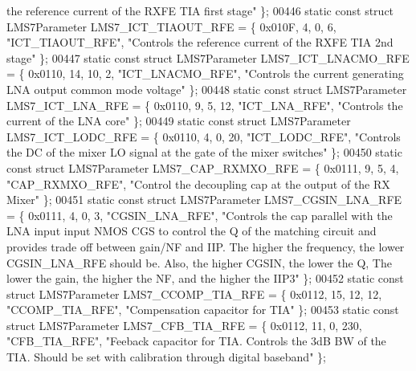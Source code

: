 \begin{DoxyCode}
{       the reference current of the RXFE TIA first stage"} \};
00446 \textcolor{keyword}{static} \textcolor{keyword}{const} \textcolor{keyword}{struct }LMS7Parameter LMS7_ICT_TIAOUT_RFE = \{ 0x010F, 4, 0, 6, \textcolor{stringliteral}{"ICT\_TIAOUT\_RFE"}, \textcolor{stringliteral}{"Controls the
       reference current of the RXFE TIA 2nd stage"} \};
00447 \textcolor{keyword}{static} \textcolor{keyword}{const} \textcolor{keyword}{struct }LMS7Parameter LMS7_ICT_LNACMO_RFE = \{ 0x0110, 14, 10, 2, \textcolor{stringliteral}{"ICT\_LNACMO\_RFE"}, \textcolor{stringliteral}{"Controls
       the current generating LNA output common mode voltage"} \};
00448 \textcolor{keyword}{static} \textcolor{keyword}{const} \textcolor{keyword}{struct }LMS7Parameter LMS7_ICT_LNA_RFE = \{ 0x0110, 9, 5, 12, \textcolor{stringliteral}{"ICT\_LNA\_RFE"}, \textcolor{stringliteral}{"Controls the
       current of the LNA core"} \};
00449 \textcolor{keyword}{static} \textcolor{keyword}{const} \textcolor{keyword}{struct }LMS7Parameter LMS7_ICT_LODC_RFE = \{ 0x0110, 4, 0, 20, \textcolor{stringliteral}{"ICT\_LODC\_RFE"}, \textcolor{stringliteral}{"Controls the DC
       of the mixer LO signal at the gate of the mixer switches"} \};
00450 \textcolor{keyword}{static} \textcolor{keyword}{const} \textcolor{keyword}{struct }LMS7Parameter LMS7_CAP_RXMXO_RFE = \{ 0x0111, 9, 5, 4, \textcolor{stringliteral}{"CAP\_RXMXO\_RFE"}, \textcolor{stringliteral}{"Control the
       decoupling cap at the output of the RX Mixer"} \};
00451 \textcolor{keyword}{static} \textcolor{keyword}{const} \textcolor{keyword}{struct }LMS7Parameter LMS7_CGSIN_LNA_RFE = \{ 0x0111, 4, 0, 3, \textcolor{stringliteral}{"CGSIN\_LNA\_RFE"}, \textcolor{stringliteral}{"Controls the
       cap parallel with the LNA input input NMOS CGS to control the Q of the matching circuit and provides trade off
       between gain/NF and IIP. The higher the frequency, the lower CGSIN\_LNA\_RFE should be. Also, the higher
       CGSIN, the lower the Q, The lower the gain, the higher the NF, and the higher the IIP3"} \};
00452 \textcolor{keyword}{static} \textcolor{keyword}{const} \textcolor{keyword}{struct }LMS7Parameter LMS7_CCOMP_TIA_RFE = \{ 0x0112, 15, 12, 12, \textcolor{stringliteral}{"CCOMP\_TIA\_RFE"}, \textcolor{stringliteral}{"Compensation
       capacitor for TIA"} \};
00453 \textcolor{keyword}{static} \textcolor{keyword}{const} \textcolor{keyword}{struct }LMS7Parameter LMS7_CFB_TIA_RFE = \{ 0x0112, 11, 0, 230, \textcolor{stringliteral}{"CFB\_TIA\_RFE"}, \textcolor{stringliteral}{"Feeback
       capacitor for TIA. Controls the 3dB BW of the TIA. Should be set with calibration through digital baseband"} \};

\end{DoxyCode}
